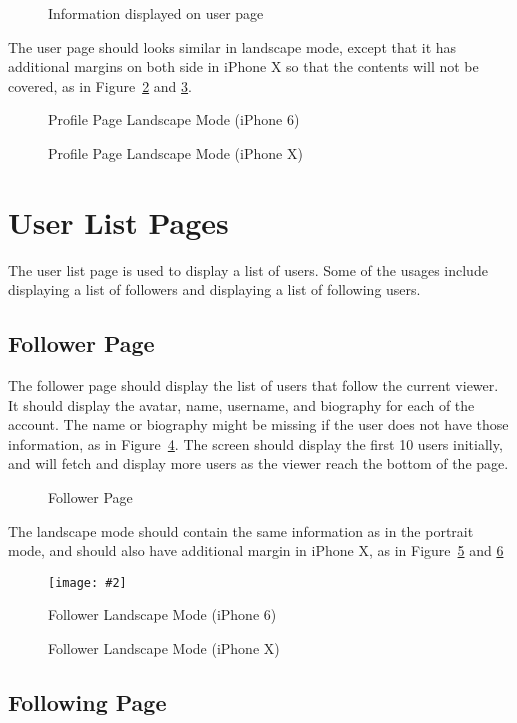 \documentclass[12pt]{article}
\newcommand{\img}[3]{
\begin{figure}
\begin{center}
\texttt{[image: \#2]}
\caption{#3}\label{#2}
\end{center}
\end{figure}
}
\newcommand{\imgh}[4]{
    \begin{figure}[!htbp]%
    \begin{center}
    \subfloat{{\texttt{[image: \#2]} }}%
    \qquad
    \subfloat{{\texttt{[image: \#3]} }}%
    \caption{#4}\label{#2}
    \end{center}
\end{figure}
}
\begin{document}
\imgh{0.45}{user_bottom}{initial_user_iphoneX}{Information displayed on user page}

The user page should looks similar in landscape mode, except that it has additional margins on both side in iPhone X so that the contents will not be covered, as in Figure~\ref{landscape_user} and \ref{landscape_user_iphoneX}.

\imgh{0.45}{landscape_user}{landscape_user_bottom}{Profile Page Landscape Mode (iPhone 6)}

\imgh{0.45}{landscape_user_iphoneX}{landscape_user_right}{Profile Page Landscape Mode (iPhone X)}

\section{User List Pages}

The user list page is used to display a list of users. Some of the usages include displaying a list of followers and displaying a list of following users.

\subsection{Follower Page}

The follower page should display the list of users that follow the current viewer. It should display the avatar, name, username, and biography for each of the account. The name or biography might be missing if the user does not have those information, as in Figure~\ref{follower}. The screen should display the first 10 users initially, and will fetch and display more users as the viewer reach the bottom of the page.

\imgh{0.45}{follower}{follower_iphoneX}{Follower Page}

The landscape mode should contain the same information as in the portrait mode, and should also have additional margin in iPhone X, as in Figure~\ref{landscape_follower} and \ref{landscape_follower_iphoneX}

\img{0.45}{landscape_follower}{Follower Landscape Mode (iPhone 6)}

\imgh{0.45}{landscape_follower_iphoneX}{landscape_follower_iphoneX_right}{Follower Landscape Mode (iPhone X)}

\subsection{Following Page}
\end{document}
